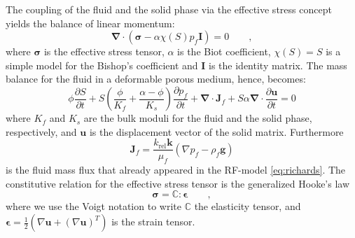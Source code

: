 The coupling of the fluid and the solid phase via the effective stress concept yields the balance of linear momentum:
\begin{equation}\label{eq:linear_momentum}
\boldsymbol{\nabla} \cdot \left( \boldsymbol{\sigma} - \alpha \chi(S) p_f \textbf{I} \right) = 0 \qquad,
\end{equation}
where $\boldsymbol{\sigma}$ is the effective stress tensor, $\alpha$ is the Biot coefficient, $\chi(S)=S$ is a simple model for the Bishop's coefficient and $\textbf{I}$ is the identity matrix. The mass balance for the fluid in a deformable porous medium, hence, becomes:
\begin{equation}\label{eq:mass_balance}
 \phi \frac{\partial S}{\partial t} + S\left(\frac{\phi}{K_f}+\frac{\alpha -\phi}{K_s}\right) \frac{\partial p_f}{\partial t}+ \boldsymbol{\nabla} \cdot \textbf{J}_f + S \alpha \boldsymbol{\nabla} \cdot \frac{\partial \textbf{u}}{\partial t} = 0
\end{equation}
where $K_f$ and $K_s$ are the bulk moduli for the fluid and the solid phase, respectively, and $\textbf{u}$ is the displacement vector of the solid matrix. Furthermore
\begin{equation}
\textbf{J}_f=\frac{k_\text{rel}\textbf{k}}{\mu_f}(\nabla p_f-\rho_f \textbf{g})
\end{equation}
is the fluid mass flux that already appeared in the RF-model \eqref{eq:richards}.
The constitutive relation for the effective stress tensor is the generalized Hooke's law
\begin{equation}\label{eq:hookes_law}
\boldsymbol{\sigma} = \mathds{C} \colon \boldsymbol{\epsilon} \qquad ,
\end{equation}
where we use the Voigt notation to write $\mathds{C}$ the elasticity tensor, and $\boldsymbol{\epsilon}=\frac{1}{2}\left(\nabla \textbf{u} + (\nabla \textbf{u})^T\right)$ is the strain tensor. 

